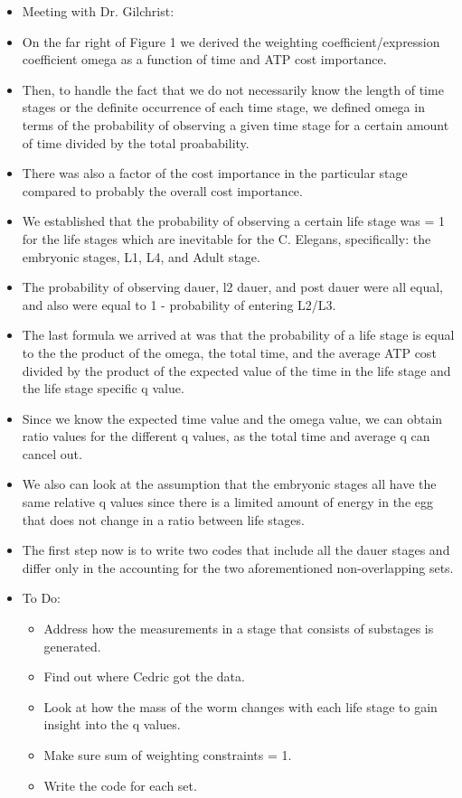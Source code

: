 \documentclass[letterpaper,index=totoc,hyperref,openany]{labbook} %
\begin{document}
\begin{itemize}
\item Meeting with Dr. Gilchrist:
\item On the far right of Figure 1 we derived the weighting coefficient/expression coefficient omega as a function of time and ATP cost importance.
\item Then, to handle the fact that we do not necessarily know the length of time stages or the definite occurrence of each time stage, we defined omega in terms of the probability of observing a given time stage for a certain amount of time divided by the total proabability.
\item There was also a factor of the cost importance in the particular stage compared to probably the overall cost importance.
\item We established that the probability of observing a certain life stage was = 1 for the life stages which are inevitable for the C. Elegans, specifically: the embryonic stages, L1, L4, and Adult stage.
\item The probability of observing dauer, l2 dauer, and post dauer were all equal, and also were equal to 1 - probability of entering L2/L3.
\item The last formula we arrived at was that the probability of a life stage is equal to the the product of the omega, the total time, and the average ATP cost divided by the product of the expected value of the time in the life stage and the life stage specific q value.
\item Since we know the expected time value and the omega value, we can obtain ratio values for the different q values, as the total time and average q can cancel out.
\item We also can look at the assumption that the embryonic stages all have the same relative q values since there is a limited amount of energy in the egg that does not change in a ratio between life stages.
\item The first step now is to write two codes that include all the dauer stages and differ only in the accounting for the two aforementioned non-overlapping sets.
\item To Do:
\begin{itemize}
\item Address how the measurements in a stage that consists of substages is generated.
\item Find out where Cedric got the data.
\item Look at how the mass of the worm changes with each life stage to gain insight into the q values.
\item Make sure sum of weighting constraints = 1.
\item Write the code for each set.
\end {itemize}
\end{itemize}
\end{document}
